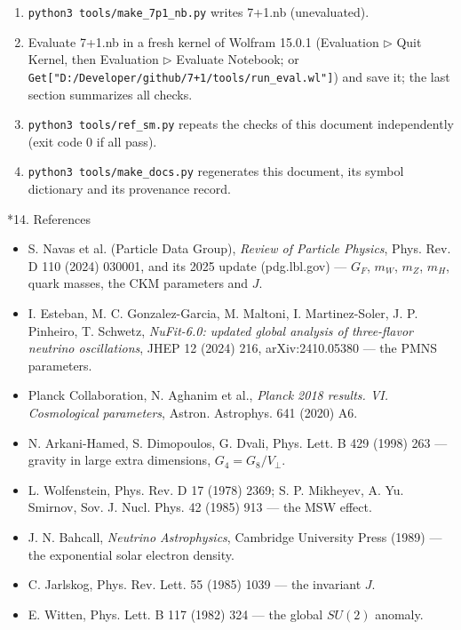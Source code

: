 \documentclass[10pt,a4paper]{article}
\makeatletter
\renewcommand\section{\@startsection{section}{1}{\z@}{-3.5ex \@plus -1ex \@minus -.2ex}{2.3ex \@plus.2ex}{\normalfont\Large\bfseries\raggedright}}
\makeatother
\begin{document}
\begin{enumerate}
\item \texttt{python3 tools/\allowbreak{}make\_\allowbreak{}7p1\_\allowbreak{}nb.py} writes 7+1.nb (unevaluated).
\item Evaluate 7+1.nb in a fresh kernel of Wolfram 15.0.1 (Evaluation \texorpdfstring{\ensuremath{\triangleright}}{▸} Quit Kernel, then Evaluation \texorpdfstring{\ensuremath{\triangleright}}{▸} Evaluate Notebook; or \texttt{Get["D:/\allowbreak{}Developer/\allowbreak{}github/\allowbreak{}7+1/\allowbreak{}tools/\allowbreak{}run\_\allowbreak{}eval.wl"]}) and save it; the last section summarizes all checks.
\item \texttt{python3 tools/\allowbreak{}ref\_\allowbreak{}sm.py} repeats the checks of this document independently (exit code 0 if all pass).
\item \texttt{python3 tools/\allowbreak{}make\_\allowbreak{}docs.py} regenerates this document, its symbol dictionary and its provenance record.
\end{enumerate}
\section*{14. References}
\begin{itemize}
\item S. Navas et al. (Particle Data Group), \emph{Review of Particle Physics}, Phys. Rev. D 110 (2024) 030001, and its 2025 update (pdg.lbl.gov) — $G_F$, $m_W$, $m_Z$, $m_H$, quark masses, the CKM parameters and $J$.
\item I. Esteban, M. C. Gonzalez-Garcia, M. Maltoni, I. Martinez-Soler, J. P. Pinheiro, T. Schwetz, \emph{NuFit-6.0: updated global analysis of three-flavor neutrino oscillations}, JHEP 12 (2024) 216, arXiv:2410.05380 — the PMNS parameters.
\item Planck Collaboration, N. Aghanim et al., \emph{Planck 2018 results. VI. Cosmological parameters}, Astron. Astrophys. 641 (2020) A6.
\item N. Arkani-Hamed, S. Dimopoulos, G. Dvali, Phys. Lett. B 429 (1998) 263 — gravity in large extra dimensions, $G_4=G_8/V_\perp$.
\item L. Wolfenstein, Phys. Rev. D 17 (1978) 2369; S. P. Mikheyev, A. Yu. Smirnov, Sov. J. Nucl. Phys. 42 (1985) 913 — the MSW effect.
\item J. N. Bahcall, \emph{Neutrino Astrophysics}, Cambridge University Press (1989) — the exponential solar electron density.
\item C. Jarlskog, Phys. Rev. Lett. 55 (1985) 1039 — the invariant $J$.
\item E. Witten, Phys. Lett. B 117 (1982) 324 — the global $SU(2)$ anomaly.
\end{itemize}
\end{document}
